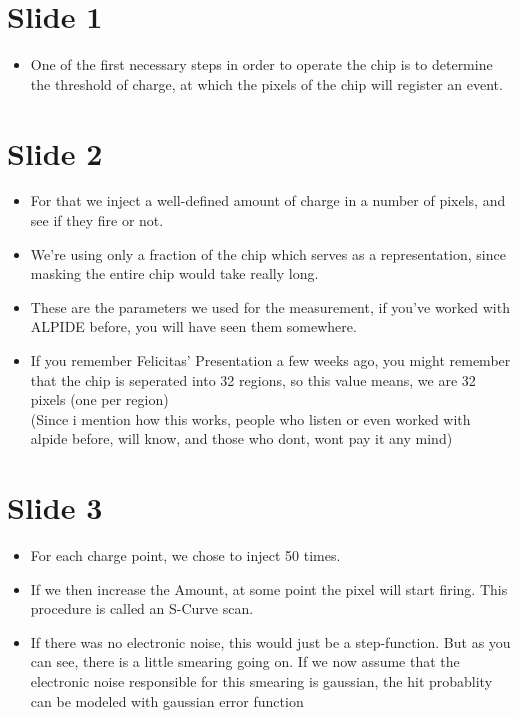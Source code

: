 
\section*{Slide 1}
\begin{itemize}
    \item One of the first necessary steps in order to operate the chip
	is to determine the threshold of charge, at which the pixels of the
	chip will register an event.
\end{itemize}
\section*{Slide 2}
\begin{itemize}
    \item For that we inject a well-defined amount of charge in a number of pixels,
	and see if they fire or not.
    \item We're using only a fraction of the chip which serves as a
	representation, since masking the entire chip would take really long.
    \item These are the parameters we used for the measurement, if you've
	worked with ALPIDE before, you will have seen them somewhere.
    \item If you remember Felicitas' Presentation a few weeks ago, you might
	remember that the chip is seperated into 32 regions, so this value
	means, we are 32 pixels (one per region) \\
	(Since i mention how this works, people who listen or even worked with
	alpide before, will know, and those who dont, wont pay it any mind)
\end{itemize}
\section*{Slide 3} 
\begin{itemize}
    \item For each charge point, we chose to inject 50 times.
    \item If we then increase the Amount, at some point the pixel will start firing.
	This procedure is called an S-Curve scan.
    \item If there was no electronic noise, this would just be a step-function.
	But as you can see, there is a little smearing going on.
	If we now assume that the electronic noise responsible for this smearing is
	gaussian, the hit probablity can be modeled with gaussian error function
\end{itemize}
